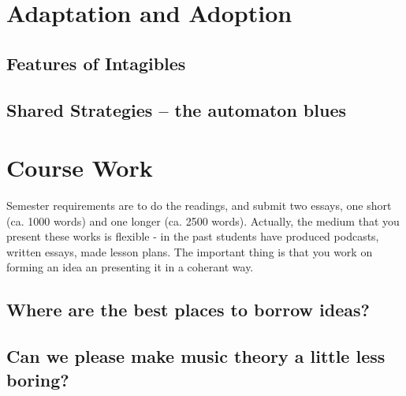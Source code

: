 \documentclass[11pt]{article}
\begin{document}
\section{Adaptation and Adoption}
\label{sec:org2928f5d}
\subsection{Features of Intagibles}
\label{sec:org41eedd2}
\subsection{Shared Strategies – the automaton blues}
\label{sec:org0efd851}

\section{Course Work}
\label{sec:org898209f}
Semester requirements are to do the readings, and submit two essays,
one short (ca. 1000 words) and one longer (ca. 2500 words). Actually,
the medium that you present these works is flexible - in the past
students have produced podcasts, written essays, made lesson
plans. The important thing is that you work on forming an idea an
presenting it in a coherant way. 

\subsection{Where are the best places to borrow ideas?}
\label{sec:orgaa542e2}
\subsection{Can we please make music theory a little less boring?}
\label{sec:org91c9cf5}
\end{document}
